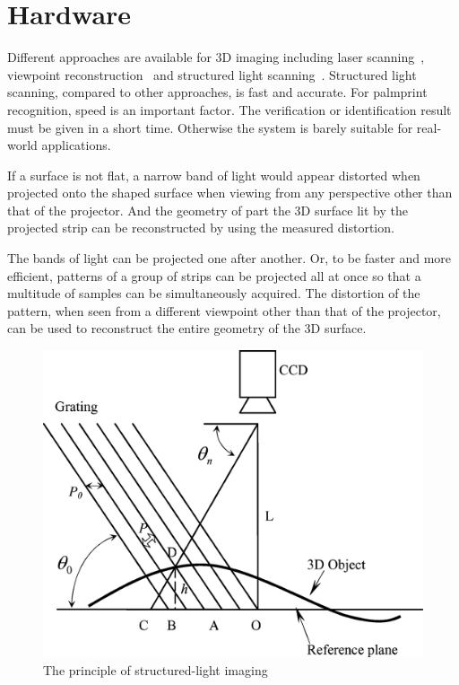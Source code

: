 \section{Hardware}
\label{sec:pastwork:hardware}


Different approaches are available for 3D imaging including laser scanning~\cite{Blais:1988te}, viewpoint reconstruction~\cite{Hartley:2000un} and structured light scanning~\cite{Halioua:1984ue}. Structured light scanning, compared to other approaches, is fast and accurate. For palmprint recognition, speed is an important factor. The verification or identification result must be given in a short time. Otherwise the system is barely suitable for real-world applications.


If a surface is not flat, a narrow band of light would appear distorted when projected onto the shaped surface when viewing from any perspective other than that of the projector. And the geometry of part the 3D surface lit by the projected strip can be reconstructed by using the measured distortion.

The bands of light can be projected one after another. Or, to be faster and more efficient, patterns of a group of strips can be projected all at once so that a multitude of samples can be simultaneously acquired. The distortion of the pattern, when seen from a different viewpoint other than that of the projector, can be used to reconstruct the entire geometry of the 3D surface.

\begin{figure}[htb]
\begin{center}
\includegraphics[width=0.9\linewidth]{ch-pastwork/figures/sli}
\caption[The principle of structured-light imaging]{The principle of structured-light imaging\cite{Li:2009eq}}
\label{fig:pastwork:sli}
\end{center}
\end{figure}

